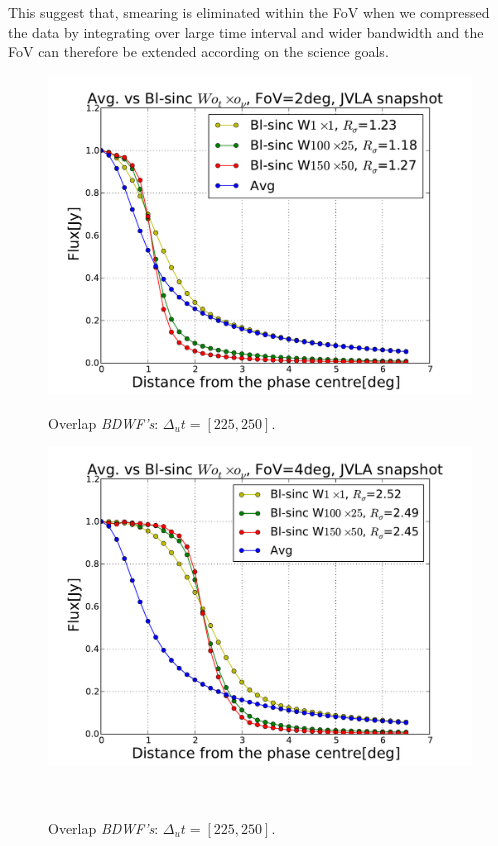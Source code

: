 \documentclass[useAMS,usenatbib]{mn2e}
\begin{document}
This suggest that, smearing is eliminated within the FoV when we compressed the data by integrating over large time interval and wider 
bandwidth and the FoV can therefore be extended according on the science goals.
\begin{figure}
  \centering
\begin{minipage}{0.45\linewidth}\includegraphics[width=1\textwidth]{./Figures/Bl-sinc-FoV2-vla.pdf}\caption{Overlap 
		\textit{BDWF's}: $\Delta_u t= [225, 250]$.}\label{fig:Bl-sinc-FoV2}\end{minipage}
\begin{minipage}{0.45\linewidth}\includegraphics[width=1\textwidth]{./Figures/Bl-sinc-FoV4-vla.pdf}\caption{Overlap 
		\textit{BDWF's}: $\Delta_u t= [225, 250]$.}\label{fig:Bl-sinc-FoV4}\end{minipage}\\

\end{figure}
\end{document}
